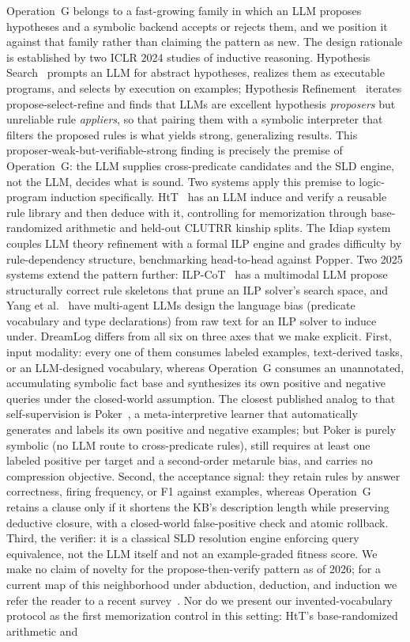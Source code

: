\documentclass[10pt,conference]{IEEEtran}
\begin{document}
Operation~G belongs to a fast-growing family in which an LLM proposes hypotheses and a symbolic backend accepts or rejects them, and we position it against that family rather than claiming the pattern as new. The design rationale is established by two ICLR 2024 studies of inductive reasoning. Hypothesis Search~\cite{wang2024hypothesis} prompts an LLM for abstract hypotheses, realizes them as executable programs, and selects by execution on examples; Hypothesis Refinement~\cite{qiu2024phenomenal} iterates propose-select-refine and finds that LLMs are excellent hypothesis \emph{proposers} but unreliable rule \emph{appliers}, so that pairing them with a symbolic interpreter that filters the proposed rules is what yields strong, generalizing results. This proposer-weak-but-verifiable-strong finding is precisely the premise of Operation~G: the LLM supplies cross-predicate candidates and the SLD engine, not the LLM, decides what is sound. Two systems apply this premise to logic-program induction specifically. HtT~\cite{zhu2024large} has an LLM induce and verify a reusable rule library and then deduce with it, controlling for memorization through base-randomized arithmetic and held-out CLUTRR kinship splits. The Idiap system~\cite{desouza2025inductive} couples LLM theory refinement with a formal ILP engine and grades difficulty by rule-dependency structure, benchmarking head-to-head against Popper. Two 2025 systems extend the pattern further: ILP-CoT~\cite{peng2025ilpcot} has a multimodal LLM propose structurally correct rule skeletons that prune an ILP solver's search space, and Yang et al.~\cite{yang2025languagebias} have multi-agent LLMs design the language bias (predicate vocabulary and type declarations) from raw text for an ILP solver to induce under. DreamLog differs from all six on three axes that we make explicit. First, input modality: every one of them consumes labeled examples, text-derived tasks, or an LLM-designed vocabulary, whereas Operation~G consumes an unannotated, accumulating symbolic fact base and synthesizes its own positive and negative queries under the closed-world assumption. The closest published analog to that self-supervision is Poker~\cite{patsantzis2026poker}, a meta-interpretive learner that automatically generates and labels its own positive and negative examples; but Poker is purely symbolic (no LLM route to cross-predicate rules), still requires at least one labeled positive per target and a second-order metarule bias, and carries no compression objective. Second, the acceptance signal: they retain rules by answer correctness, firing frequency, or F1 against examples, whereas Operation~G retains a clause only if it shortens the KB's description length while preserving deductive closure, with a closed-world false-positive check and atomic rollback. Third, the verifier: it is a classical SLD resolution engine enforcing query equivalence, not the LLM itself and not an example-graded fitness score. We make no claim of novelty for the propose-then-verify pattern as of 2026; for a current map of this neighborhood under abduction, deduction, and induction we refer the reader to a recent survey~\cite{he2025reasoning}. Nor do we present our invented-vocabulary protocol as the first memorization control in this setting: HtT's base-randomized arithmetic and 
\end{document}
